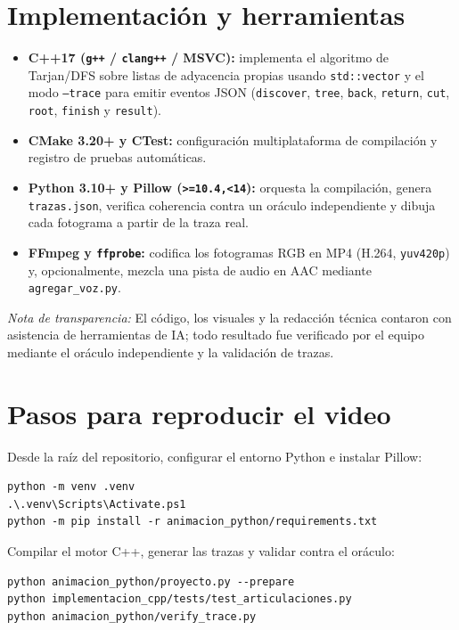 \documentclass[11pt,a4paper]{article}
\begin{document}
\section{Implementación y herramientas}
\begin{itemize}
  \item \textbf{C++17 (\texttt{g++} / \texttt{clang++} / MSVC):} implementa el
    algoritmo de Tarjan/DFS sobre listas de adyacencia propias usando
    \texttt{std::vector} y el modo \texttt{--trace} para emitir eventos JSON
    (\texttt{discover}, \texttt{tree}, \texttt{back}, \texttt{return},
    \texttt{cut}, \texttt{root}, \texttt{finish} y \texttt{result}).
  \item \textbf{CMake 3.20+ y CTest:} configuración multiplataforma de
    compilación y registro de pruebas automáticas.
  \item \textbf{Python 3.10+ y Pillow (\texttt{>=10.4,<14}):} orquesta la
    compilación, genera \texttt{trazas.json}, verifica coherencia contra un
    oráculo independiente y dibuja cada fotograma a partir de la traza real.
  \item \textbf{FFmpeg y \texttt{ffprobe}:} codifica los fotogramas RGB en
    MP4 (H.264, \texttt{yuv420p}) y, opcionalmente, mezcla una pista de audio
    en AAC mediante \texttt{agregar\_voz.py}.
\end{itemize}

\emph{Nota de transparencia:} El código, los visuales y la redacción técnica
contaron con asistencia de herramientas de IA; todo resultado fue verificado por
el equipo mediante el oráculo independiente y la validación de trazas.

\section{Pasos para reproducir el video}
Desde la raíz del repositorio, configurar el entorno Python e instalar Pillow:
\begin{verbatim}
python -m venv .venv
.\.venv\Scripts\Activate.ps1
python -m pip install -r animacion_python/requirements.txt
\end{verbatim}

Compilar el motor C++, generar las trazas y validar contra el oráculo:
\begin{verbatim}
python animacion_python/proyecto.py --prepare
python implementacion_cpp/tests/test_articulaciones.py
python animacion_python/verify_trace.py
\end{verbatim}
\end{document}

